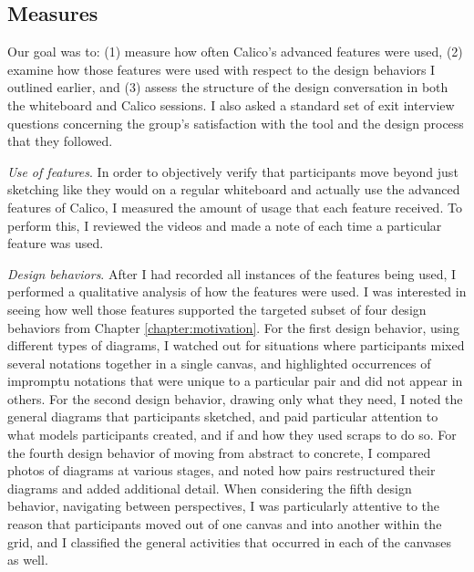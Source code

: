 \subsection {Measures}
\label{experimentaldesign:4}

Our goal was to: (1) measure how often Calico's advanced features were used, (2) examine how those features were used with respect to the design behaviors I outlined earlier, and (3) assess the structure of the design conversation in both the whiteboard and Calico sessions. I also asked a standard set of exit interview questions concerning the group's satisfaction with the tool and the design process that they followed.

    \emph{Use of features}. In order to objectively verify that participants move beyond just sketching like they would on a regular whiteboard and actually use the advanced features of Calico, I measured the amount of usage that each feature received. To perform this, I reviewed the videos and made a note of each time a particular feature was used. 

    \emph{Design behaviors}. After I had recorded all instances of the features being used, I performed a qualitative analysis of how the features were used. I was interested in seeing how well those features supported the targeted subset of four design behaviors from Chapter \ref{chapter:motivation}. For the first design behavior, using different types of diagrams, I watched out for situations where participants mixed several notations together in a single canvas, and highlighted occurrences of impromptu notations that were unique to a particular pair and did not appear in others. For the second design behavior, drawing only what they need, I noted the general diagrams that participants sketched, and paid particular attention to what models participants created, and if and how they used scraps to do so. For the fourth design behavior of moving from abstract to concrete, I compared photos of diagrams at various stages, and noted how pairs restructured their diagrams and added additional detail. When considering the fifth design behavior, navigating between perspectives, I was particularly attentive to the reason that participants moved out of one canvas and into another within the grid, and I classified the general activities that occurred in each of the canvases as well.

